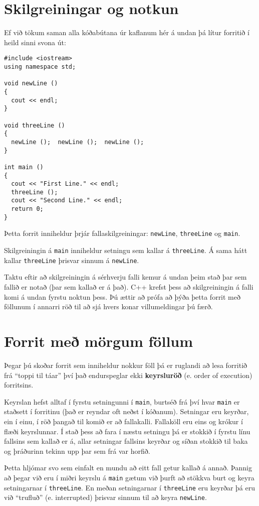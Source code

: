 \section {Skilgreiningar og notkun}

Ef við tökum saman alla kóðabútana úr kaflanum hér á undan þá lítur forritið í heild sinni svona út:

\begin{verbatim}
#include <iostream>
using namespace std;

void newLine ()
{
  cout << endl;
}

void threeLine ()
{
  newLine ();  newLine ();  newLine ();
}

int main ()
{
  cout << "First Line." << endl;
  threeLine ();
  cout << "Second Line." << endl;
  return 0;
}
\end{verbatim}

Þetta forrit inniheldur þrjár fallaskilgreiningar: {\tt newLine}, {\tt threeLine} og {\tt main}.

Skilgreiningin á {\tt main} inniheldur setningu sem kallar á {\tt threeLine}.
Á sama hátt kallar {\tt threeLine} þrisvar sinnum á {\tt newLine}.

Taktu eftir að skilgreiningin á sérhverju falli kemur á undan þeim stað þar sem fallið er notað (þar sem kallað er á það).
C++ krefst þess að skilgreiningin á falli komi á undan fyrstu noktun þess.
Þú ættir að prófa að þýða þetta forrit með föllunum í annarri röð til að sjá hvers konar villumeldingar þú færð.

\section {Forrit með mörgum föllum}

Þegar þú skoðar forrit sem inniheldur nokkur föll þá er ruglandi að lesa forritið frá ``toppi til táar''
því það endurspeglar ekki {\bf keyrsluröð} (e. order of execution) forritsins.

Keyrslan hefst alltaf í fyrstu setningunni í {\tt main}, burtséð frá því hvar {\tt main} er staðsett í forritinu (það er reyndar oft neðst í kóðanum).
Setningar eru keyrðar, ein í einu, í röð þangað til komið er að fallakalli.
Fallaköll eru eins og krókur í flæði keyrslunnar.
Í stað þess að fara í næstu setningu þá er stokkið í fyrstu línu fallsins sem kallað er á, allar setningar fallsins keyrðar og síðan stokkið til baka og þráðurinn tekinn upp þar sem frá var horfið.

Þetta hljómar svo sem einfalt en mundu að eitt fall getur kallað á annað.
Þannig að þegar við eru í miðri keyrslu á {\tt main} gætum við þurft að stökkva burt og keyra setningarnar í {\tt threeLine}.
En meðan setningarnar í {\tt threeLine} eru keyrðar þá eru við ``trufluð'' (e. interrupted) þrisvar sinnum til að keyra {\tt newLine}.

